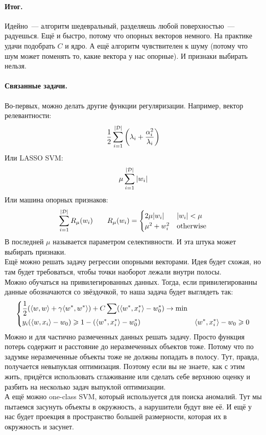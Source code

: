 \documentclass{article}
\begin{document}
    \paragraph{Итог.}
    Идейно~--- алгоритм шедевральный, разделяешь любой  поверхностью~--- радуешься. Ещё и быстро, потому что опорных векторов немного. На практике удачи подобрать $C$ и ядро. А ещё алгоритм чувствителен к шуму (потому что шум может поменять то, какие вектора у нас опорные). И признаки выбирать нельзя.
    \paragraph{Связанные задачи.}
    Во-первых, можно делать другие функции регуляризации. Например, вектор релевантности:
    \[
    \frac12\sum\limits_{i=1}^{|{\mathcal{D}}|}\left(\lambda_i+\frac{\alpha_i^2}{\lambda_i}\right)
    \]
    Или LASSO SVM:
    \[
    \mu\sum\limits_{i=1}^{|{\mathcal{D}}|}|w_i|
    \]
    Или машина опорных признаков:
    \[
    \sum\limits_{i=1}^{|{\mathcal{D}}|}R_\mu(w_i)\qquad R_\mu(w_i)=\begin{cases}
        2\mu|w_i| & |w_i|<\mu\\
        \mu^2+w_i^2 & \mathrm{otherwise}
    \end{cases}
    \]
    В последней $\mu$ называется параметром селективности. И эта штука может выбирать признаки.\\
    Ещё можно решать задачу регрессии опорными векторами. Идея будет схожая, но там будет требоваться, чтобы точки наоборот лежали внутри полосы.\\
    Можно обучаться на привилегированных данных. Тогда, если привилегированны данные обозначаются со звёздочкой, то наша задача будет выглядеть так:
    \[
    \left\{\begin{aligned}
        &\frac12({\left\langle{w},{w}\right\rangle}+\gamma{\left\langle{w^*},{w^*}\right\rangle})+C\sum({\left\langle{w^*},{x_i^*}\right\rangle}-w_0^*)\to\min\\
        &y_i({\left\langle{w},{x_i}\right\rangle}-w_0)\geqslant1-({\left\langle{w^*},{x_i^*}\right\rangle}-w_0^*)
        &{\left\langle{w^*},{x_i^*}\right\rangle}-w_0\geqslant0
    \end{aligned}\right.
    \]
    Можно и для частично размеченных данных решать задачу. Просто функция потерь содержит и расстояние до неразмеченных объектов тоже. Потому что по задумке неразмеченные объекты тоже не должны попадать в полосу. Тут, правда, получается невыпуклая оптимизация. Поэтому если вы не знаете, как с этим жить, придётся использовать сглаживание или сделать себе верхнюю оценку и разбить на несколько задач выпуклой оптимизации.\\
    А ещё можно one-class SVM, который используется для поиска аномалий. Тут мы пытаемся засунуть объекты в окружность, а нарушители будут вне её. И ещё у нас будет проекция в пространство большей размерности, которая их в окружность и засунет.
\end{document}
